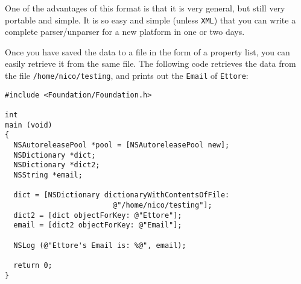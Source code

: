 \documentclass[a4paper]{article}
\begin{document}
One of the advantages of this format is that it is very general, but
still very portable and simple.  It is so easy and simple (unless
\texttt{XML}) that you can write a complete parser/unparser for a new
platform in one or two days.

Once you have saved the data to a file in the form of a property list,
you can easily retrieve it from the same file.  The following code
retrieves the data from the file \texttt{/home/nico/testing}, and
prints out the \texttt{Email} of \texttt{Ettore}:
\begin{verbatim}
#include <Foundation/Foundation.h>

int 
main (void)
{
  NSAutoreleasePool *pool = [NSAutoreleasePool new];
  NSDictionary *dict;
  NSDictionary *dict2;
  NSString *email;

  dict = [NSDictionary dictionaryWithContentsOfFile: 
                         @"/home/nico/testing"];
  dict2 = [dict objectForKey: @"Ettore"];
  email = [dict2 objectForKey: @"Email"];

  NSLog (@"Ettore's Email is: %@", email);

  return 0;
}
\end{verbatim}
\end{document}
